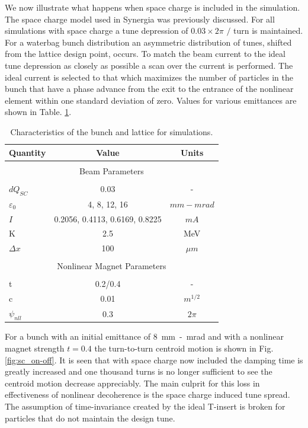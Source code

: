 \documentclass[aps,prstab,twocolumn, groupedaddress]{revtex4-1}
\begin{document}
We now illustrate what happens when space charge is included in the simulation. The 
space charge model used in Synergia was previously discussed. For all simulations with 
space charge a tune depression of $0.03 \times 2\pi$ $/$ turn is maintained. For a 
waterbag bunch distribution an asymmetric distribution of tunes, shifted from the lattice 
design point, occurs. To match the beam current to the ideal tune depression as closely 
as possible a scan over the current is performed. The ideal current is selected to that 
which maximizes the number of particles in the bunch that have a phase advance from the 
exit to the entrance of the nonlinear element within one standard deviation of zero. Values 
for various emittances are shown in Table. \ref{table:sc_params}.

\begin{table}
	\caption{\label{table:sc_params} Characteristics of the bunch and lattice for 
	simulations.}
	\begin{ruledtabular}
	\begin{tabular}{l|cc}
		\hline
		Quantity & Value & Units \\
		\hline
		\multicolumn{3}{c}{} \\[-1em]
		\multicolumn{3}{c}{Beam Parameters} \\
		\hline
		\\[-1em]
		$dQ_{SC}$ & 0.03 & - \\
		$\varepsilon_0$ & 4, 8, 12, 16& $mm-mrad$ \\
		$I$ &0.2056, 0.4113, 0.6169,  0.8225 & $mA$ \\
		K    &  2.5  & MeV \\
		$\Delta x$& 100 & $\mu m$ \\
		\hline
		\multicolumn{3}{c}{} \\[-1em]
		\multicolumn{3}{c}{Nonlinear Magnet Parameters} \\
		\hline
		\\[-1em]
		t & 0.2/0.4 & - \\
		c & 0.01 & $m^{1/2}$ \\
		$\psi_{nll}$& 0.3 & $2\pi$ \\
		\hline
	\end{tabular}
	\end{ruledtabular}
\end{table}	

For a bunch with an initial emittance of \SI{8}{mm-mrad} and with a nonlinear magnet 
strength $t=0.4$ the turn-to-turn centroid motion is shown in Fig. \ref{fig:sc_on-off}. It is 
seen that with space charge now included the damping time is greatly increased and one 
thousand turns is no longer sufficient to see the centroid motion decrease appreciably. 
The main culprit for this loss in effectiveness of nonlinear decoherence is the space 
charge induced tune spread. The assumption of time-invariance created by the ideal 
T-insert is broken for particles that do not maintain the design tune. 
\end{document}
